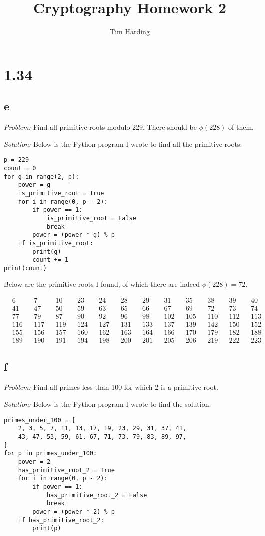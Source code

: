 \documentclass[12pt]{article}
\title{Cryptography Homework 2}
\author{Tim Harding}
\begin{document}
\maketitle

\section*{1.34}
\subsection*{e}
\textit{Problem:} Find all primitive roots modulo 229. There should be $\phi(228)$ of them.

\textit{Solution:} Below is the Python program I wrote to find all the primitive roots:
\begin{verbatim}
p = 229
count = 0
for g in range(2, p):
    power = g
    is_primitive_root = True
    for i in range(0, p - 2):
        if power == 1:
            is_primitive_root = False
            break
        power = (power * g) % p
    if is_primitive_root:
        print(g)
        count += 1
print(count)
\end{verbatim}

Below are the primitive roots I found, of which there are indeed $\phi(228) = 72$.

\begin{align*}
    &6 & &7 & &10 & &23 & &24 & &28 & &29 & &31 & &35 & &38 & &39 & &40 \\
    &41 & &47 & &50 & &59 & &63 & &65 & &66 & &67 & &69 & &72 & &73 & &74 \\
    &77 & &79  & &87 & &90 & &92 & &96 & &98 & &102 & &105 & &110 & &112 & &113 \\
    &116 & &117& &119& &124& &127& &131& &133& &137& &139& &142& &150 & &152 \\
    &155 & &156 & &157 & &160 & &162 & &163 & &164 & &166 & &170 & &179 & &182 & &188 \\
    &189 & &190 & &191 & &194 & &198 & &200 & &201 & &205 & &206 & &219 & &222 & &223
\end{align*}

\subsection*{f}
\textit{Problem:} Find all primes less than 100 for which 2 is a primitive root.

\textit{Solution:} Below is the Python program I wrote to find the solution:
\begin{verbatim}
primes_under_100 = [
    2, 3, 5, 7, 11, 13, 17, 19, 23, 29, 31, 37, 41,
    43, 47, 53, 59, 61, 67, 71, 73, 79, 83, 89, 97,
]
for p in primes_under_100:
    power = 2
    has_primitive_root_2 = True
    for i in range(0, p - 2):
        if power == 1:
            has_primitive_root_2 = False
            break
        power = (power * 2) % p
    if has_primitive_root_2:
        print(p)
\end{verbatim}
\end{document}
